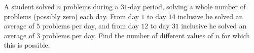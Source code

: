 A student solved $n$ problems during a $31$-day period, solving a whole number of problems (possibly zero) each day. From day $1$ to day $14$ inclusive he solved an average of $5$ problems per day, and from day $12$ to day $31$ inclusive he solved an average of $3$ problems per day. Find the number of different values of $n$ for which this is possible.
